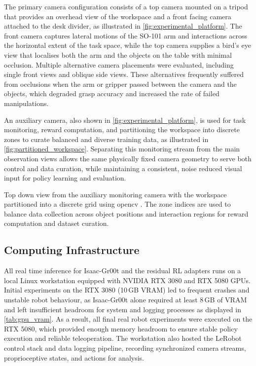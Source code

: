 The primary camera configuration consists of a top camera mounted on a tripod that provides an overhead view of the workspace and a front facing camera attached to the desk divider, as illustrated in \cref{fig:experimental_platform}. The front camera captures lateral motions of the SO-101 arm and interactions across the horizontal extent of the task space, while the top camera supplies a bird's eye view that localises both the arm and the objects on the table with minimal occlusion. Multiple alternative camera placements were evaluated, including single front views and oblique side views. These alternatives frequently suffered from occlusions when the arm or gripper passed between the camera and the objects, which degraded grasp accuracy and increased the rate of failed manipulations.

An auxiliary camera, also shown in \cref{fig:experimental_platform}, is used for task monitoring, reward computation, and partitioning the workspace into discrete zones to curate balanced and diverse training data, as illustrated in \cref{fig:partitioned_workspace}. Separating this monitoring stream from the main observation views allows the same physically fixed camera geometry to serve both control and data curation, while maintaining a consistent, noise reduced visual input for policy learning and evaluation.

{Top down view from the auxiliary monitoring camera with the workspace partitioned into a discrete grid using opencv \cite{OPENCV2000}. The zone indices are used to balance data collection across object positions and interaction regions for reward computation and dataset curation.}


\subsection{Computing Infrastructure}

All real time inference for Isaac-Gr00t and the residual \ac{RL} adapters runs on a local Linux workstation equipped with NVIDIA RTX 3080 and RTX 5080 \acp{GPU}. Initial experiments on the RTX 3080 (10\,GB VRAM) led to frequent crashes and unstable robot behaviour, as Isaac-Gr00t alone required at least 8\,GB of VRAM and left insufficient headroom for system and logging processes as displayed in \cref{tab:gpu_vram}. As a result, all final real robot experiments were executed on the RTX 5080, which provided enough memory headroom to ensure stable policy execution and reliable teleoperation. The workstation also hosted the LeRobot control stack and data logging pipeline, recording synchronized camera streams, proprioceptive states, and actions for analysis.

